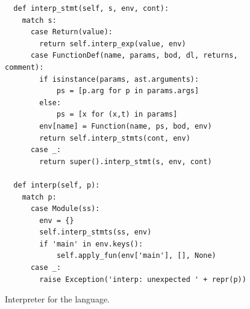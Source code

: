 \documentclass[7x10]{TimesAPriori_MIT}%
\numberwithin{theorem}{chapter}
\numberwithin{definition}{chapter}
\numberwithin{equation}{chapter}
\begin{document}
\begin{figure}[tp]
\begin{tcolorbox}[colback=white]
{\begin{lstlisting}
  def interp_stmt(self, s, env, cont):
    match s:
      case Return(value):
        return self.interp_exp(value, env)
      case FunctionDef(name, params, bod, dl, returns, comment):
        if isinstance(params, ast.arguments):
            ps = [p.arg for p in params.args]
        else:
            ps = [x for (x,t) in params]
        env[name] = Function(name, ps, bod, env)
        return self.interp_stmts(cont, env)
      case _:
        return super().interp_stmt(s, env, cont)
    
  def interp(self, p):
    match p:
      case Module(ss):
        env = {}
        self.interp_stmts(ss, env)
        if 'main' in env.keys():
            self.apply_fun(env['main'], [], None)
      case _:
        raise Exception('interp: unexpected ' + repr(p))
\end{lstlisting}
\fi}
  \end{tcolorbox}

  \caption{Interpreter for the \LangFun{} language.}
\label{fig:interp-Lfun}
\end{figure}


\end{document}
